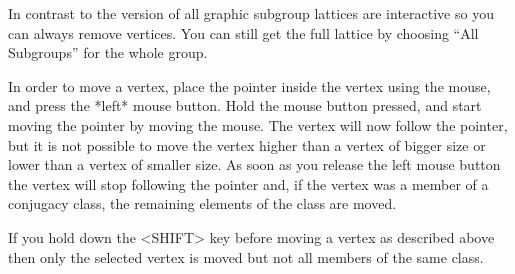 In contrast to the {} version of {\XGAP} all graphic subgroup lattices 
are interactive so you can always remove vertices. You can still get the
full lattice by choosing ``All Subgroups'' for the whole group.

%







In order to move a vertex, place the  pointer inside the vertex using the
mouse, and press the *left* mouse button.  Hold the mouse button pressed,
and start moving  the pointer by moving  the mouse.  The  vertex will now
follow the pointer, but it is not possible to move the vertex higher than
a vertex  of bigger size  
or lower than a vertex of smaller
size.
As soon as you release the left mouse
button the vertex will stop following the pointer  and, if the vertex was
a member of a  conjugacy class, the remaining elements  of the class  are
moved.

If you hold  down  the <SHIFT> key before  moving  a vertex as  described
above then  only the selected vertex is moved but not all members of the
same class.


